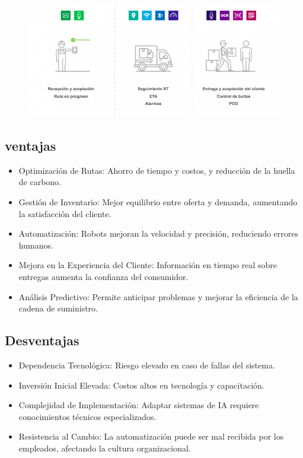 \documentclass[12pt]{article}
\begin{document}
\begin{figure}[h!]
    \centering
    \includegraphics[width=.6\textwidth]{rutas.png}
    \label{fig:my_label}
\end{figure}

\subsection{ventajas}

\begin{itemize}
    \item Optimización de Rutas: 
    Ahorro de tiempo y costos, y reducción de la huella de carbono.
    \item Gestión de Inventario: 
    Mejor equilibrio entre oferta y demanda, aumentando la satisfacción del cliente.
    \item Automatización: 
    Robots mejoran la velocidad y precisión, reduciendo errores humanos.
    \item Mejora en la Experiencia del Cliente: 
    Información en tiempo real sobre entregas aumenta la confianza del consumidor.
    \item Análisis Predictivo: 
    Permite anticipar problemas y mejorar la eficiencia de la cadena de suministro.    
\end{itemize}

\subsection{Desventajas}

\begin{itemize}
    \item Dependencia Tecnológica: 
    Riesgo elevado en caso de fallas del sistema.
    \item Inversión Inicial Elevada: 
    Costos altos en tecnología y capacitación.
    \item Complejidad de Implementación: 
    Adaptar sistemas de IA requiere conocimientos técnicos especializados.
    \item Resistencia al Cambio: 
    La automatización puede ser mal recibida por los empleados, afectando la cultura organizacional.
\end{itemize}
\end{document}

